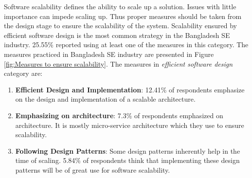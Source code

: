  Software scalability defines the ability to scale up a solution. Issues with little importance can impede scaling up. Thus proper measures should be taken from the design stage to ensure the scalability of the system. Scalability ensured by efficient software design is the most common strategy in the Bangladesh SE industry. 25.55\% reported using at least one of the measures in this category. The measures practiced in Bangladesh SE industry are presented in Figure \ref{fig:Measures to ensure scalability}. The measures in \emph{efficient software design} category are:
 \begin{enumerate}[label=(\alph*)]
 
     \item \textbf{Efficient Design and Implementation}: 12.41\% of respondents emphasize on the design and implementation of a scalable architecture. 
    
     \item \textbf{Emphasizing on architecture}: 7.3\% of respondents emphasized on architecture. It is mostly micro-service architecture which they use to ensure scalability.

    
    \item \textbf{Following Design Patterns}: Some design patterns inherently help in the time of scaling. 5.84\% of respondents think that implementing these design patterns will be of great use for software scalability.
 
 \end{enumerate}
 

